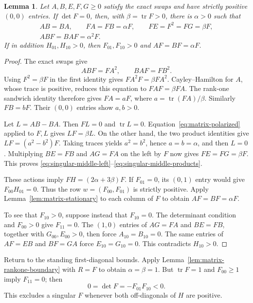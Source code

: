 \documentclass[11pt,a4paper]{article}
\newtheorem{lemma}[theorem]{Lemma}
\newcommand{\tr}{\operatorname{tr}}
\begin{document}
\begin{lemma}\label{lem:matrix-singular-middle}
Let $A,B,E,F,G\ge0$ satisfy the exact swaps and have strictly positive
$(0,0)$ entries. If $\det F=0$, then, with $\beta=\tr F>0$, there is
$\alpha>0$ such that
\begin{gather}
AB=BA,\qquad FA=FB=\alpha F,\qquad FE=F^2=FG=\beta F,
 \label{eq:singular-middle-left}\\
ABF=BAF=\alpha^2F.\label{eq:singular-middle-products}
\end{gather}
If in addition $H_{01},H_{10}>0$, then $F_{01},F_{10}>0$ and
$AF=BF=\alpha F$.
\end{lemma}
\begin{proof}
The exact swaps give
\[
ABF=FA^2,\qquad BAF=FB^2.
\]
Using $F^2=\beta F$ in the first identity gives
$FA^2F=\beta FA^2$. Cayley--Hamilton for $A$, whose trace is positive,
reduces this equation to $FAF=\beta FA$. The rank-one sandwich identity
therefore gives $FA=aF$, where $a=\tr(FA)/\beta$.
Similarly $FB=bF$. Their $(0,0)$ entries show $a,b>0$.

Let $L=AB-BA$. Then $FL=0$ and $\tr L=0$.
Equation~\eqref{eq:matrix-polarized} applied to $F,L$ gives
$LF=\beta L$. On the other hand, the two product identities give
$LF=(a^2-b^2)F$. Taking traces yields $a^2=b^2$, hence $a=b=\alpha$,
and then $L=0$. Multiplying $BE=FB$ and $AG=FA$ on the left by $F$
now gives $FE=FG=\beta F$. This proves
\eqref{eq:singular-middle-left}--\eqref{eq:singular-middle-products}.

These actions imply $FH=(2\alpha+3\beta)F$. If $F_{01}=0$, its
$(0,1)$ entry would give $F_{00}H_{01}=0$. Thus the row
$w=(F_{00},F_{01})$ is strictly positive. Apply
Lemma~\ref{lem:matrix-stationary} to each column of $F$ to obtain
$AF=BF=\alpha F$.

To see that $F_{10}>0$, suppose instead that $F_{10}=0$.
The determinant condition and $F_{00}>0$ give $F_{11}=0$.
The $(1,0)$ entries of $AG=FA$ and $BE=FB$, together with
$G_{00},E_{00}>0$, then force $A_{10}=B_{10}=0$.
The same entries of $AF=EB$ and $BF=GA$ force
$E_{10}=G_{10}=0$. This contradicts $H_{10}>0$.
\end{proof}

Return to the standing first-diagonal bounds. Apply
Lemma~\ref{lem:matrix-rankone-boundary} with $R=F$ to obtain
$\alpha=\beta=1$. But $\tr F=1$ and $F_{00}\ge1$ imply $F_{11}=0$;
then
\[
0=\det F=-F_{01}F_{10}<0.
\]
This excludes a singular $F$ whenever both off-diagonals of $H$ are
positive.
\end{document}
